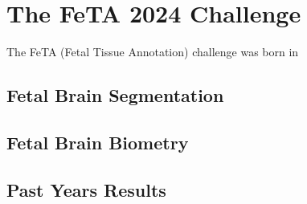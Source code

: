 \chapter{The FeTA 2024 Challenge}
\vspace{1cm}

The FeTA (Fetal Tissue Annotation) challenge was born in 

\section{Fetal Brain Segmentation}

\section{Fetal Brain Biometry}

\section{Past Years Results}
